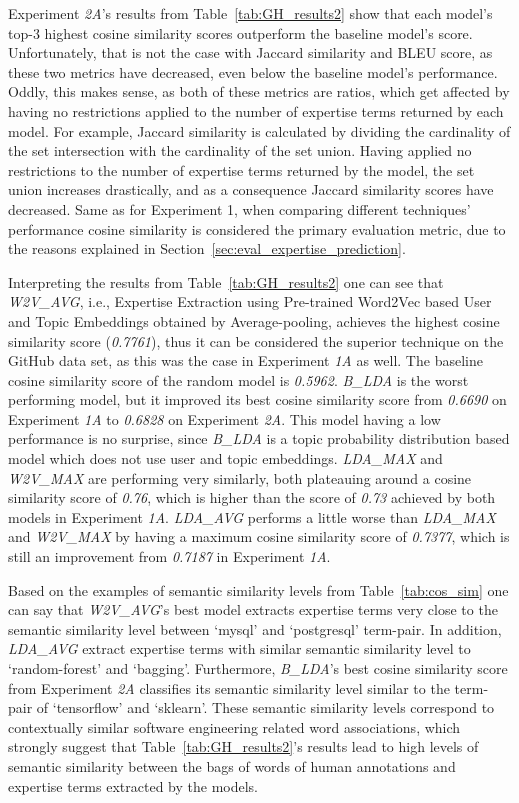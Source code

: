            Experiment \emph{2A}'s results from Table~\ref{tab:GH_results2} show that each model's top-$3$ highest cosine similarity scores outperform the baseline model's score. Unfortunately, that is not the case with Jaccard similarity and BLEU score, as these two metrics have decreased, even below the baseline model's performance. Oddly, this makes sense, as both of these metrics are ratios, which get affected by having no restrictions applied to the number of expertise terms returned by each model. For example, Jaccard similarity is calculated by dividing the cardinality of the set intersection with the cardinality of the set union. Having applied no restrictions to the number of expertise terms returned by the model, the set union increases drastically, and as a consequence Jaccard similarity scores have decreased. Same as for Experiment 1, when comparing different techniques' performance cosine similarity is considered the primary evaluation metric, due to the reasons explained in Section~\ref{sec:eval_expertise_prediction}.
            
            Interpreting the results from Table~\ref{tab:GH_results2} one can see that \emph{W2V\_AVG}, i.e.,  Expertise Extraction using Pre-trained Word2Vec based User and Topic Embeddings obtained by Average-pooling, achieves the highest cosine similarity score (\emph{0.7761}), thus it can be considered the superior technique on the GitHub data set, as this was the case in Experiment \emph{1A} as well. The baseline cosine similarity score of the random model is \emph{0.5962}. \emph{B\_LDA} is the worst performing model, but it improved its best cosine similarity score from \emph{0.6690} on Experiment \emph{1A} to \emph{0.6828} on Experiment \emph{2A}. This model having a low performance is no surprise, since \emph{B\_LDA} is a topic probability distribution based model which does not use user and topic embeddings. \emph{LDA\_MAX} and \emph{W2V\_MAX} are performing very similarly, both plateauing around a cosine similarity score of \emph{0.76}, which is higher than the score of \emph{0.73} achieved by both models in Experiment \emph{1A}. \emph{LDA\_AVG} performs a little worse than \emph{LDA\_MAX} and \emph{W2V\_MAX} by having a maximum cosine similarity score of \emph{0.7377}, which is still an improvement from \emph{0.7187} in Experiment \emph{1A}.
            
            Based on the examples of semantic similarity levels from Table~\ref{tab:cos_sim} one can say that \emph{W2V\_AVG}'s best model extracts expertise terms very close to the semantic similarity level between `mysql' and `postgresql' term-pair. In addition, \emph{LDA\_AVG} extract expertise terms with similar semantic similarity level to `random-forest' and `bagging'. Furthermore, \emph{B\_LDA}'s best cosine similarity score from Experiment \emph{2A} classifies its semantic similarity level similar to the term-pair of `tensorflow' and `sklearn'. These semantic similarity levels correspond to contextually similar software engineering related word associations, which strongly suggest that Table~\ref{tab:GH_results2}'s results lead to high levels of semantic similarity between the bags of words of human annotations and expertise terms extracted by the models.
             
